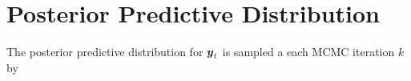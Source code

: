 \documentclass[fleqn]{article}
\def\bm#1{\mbox{\boldmath $#1$}}
\begin{document}
\section{Posterior Predictive Distribution}
%
The posterior predictive distribution for $\bm{y}_t$ is sampled a each MCMC iteration $k$ by

% 
%     
\end{document}
